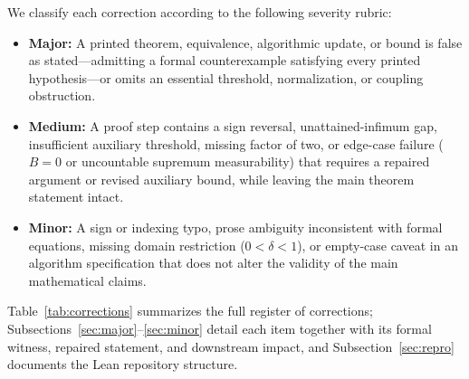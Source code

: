 \documentclass[11pt,letterpaper]{article}
\theoremstyle{definition}
\begin{document}
We classify each correction according to the following severity rubric:
\begin{itemize}[leftmargin=2em,itemsep=2pt]
  \item \textbf{Major:} A printed theorem, equivalence, algorithmic update, or bound is false as stated—admitting a formal counterexample satisfying every printed hypothesis—or omits an essential threshold, normalization, or coupling obstruction.
  \item \textbf{Medium:} A proof step contains a sign reversal, unattained-infimum gap, insufficient auxiliary threshold, missing factor of two, or edge-case failure ($B=0$ or uncountable supremum measurability) that requires a repaired argument or revised auxiliary bound, while leaving the main theorem statement intact.
  \item \textbf{Minor:} A sign or indexing typo, prose ambiguity inconsistent with formal equations, missing domain restriction ($0<\delta<1$), or empty-case caveat in an algorithm specification that does not alter the validity of the main mathematical claims.
\end{itemize}

Table~\ref{tab:corrections} summarizes the full register of corrections; Subsections~\ref{sec:major}--\ref{sec:minor} detail each item together with its formal witness, repaired statement, and downstream impact, and Subsection~\ref{sec:repro} documents the Lean repository structure.
\end{document}
